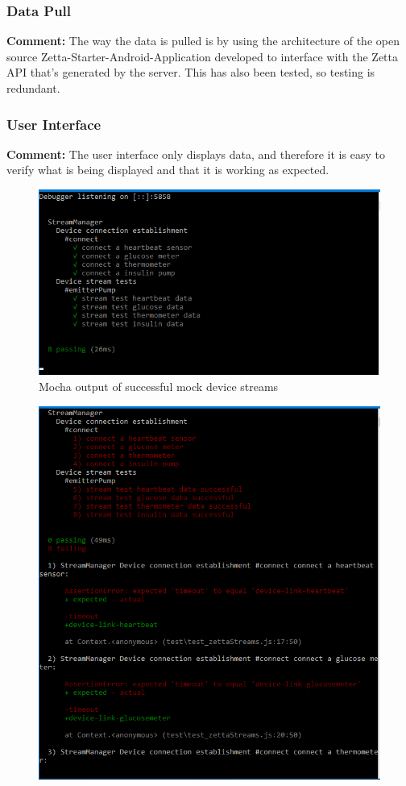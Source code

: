 \documentclass[12pt]{article}
\begin{document}
{	\subsubsection{Data Pull}
	\textbf{Comment:} The way the data is pulled is by using the architecture of the open source Zetta-Starter-Android-Application developed to interface with the Zetta API that's generated by the server. This has also been tested, so testing is redundant.
	\subsubsection{User Interface}
	\textbf{Comment:} The user interface only displays data, and therefore it is easy to verify what is being displayed and that it is working as expected.
	
	
	\begin{figure}[h!]
		\includegraphics[width=\textwidth]{tests/zettaStream/test-zetta-stream-pass}
		\caption{Mocha output of successful mock device streams}
	\end{figure}
	\begin{figure}[h!]
		\includegraphics[width=\textwidth]{tests/zettaStream/test-zetta-stream-fail00}

\end{figure}}
\end{document}
